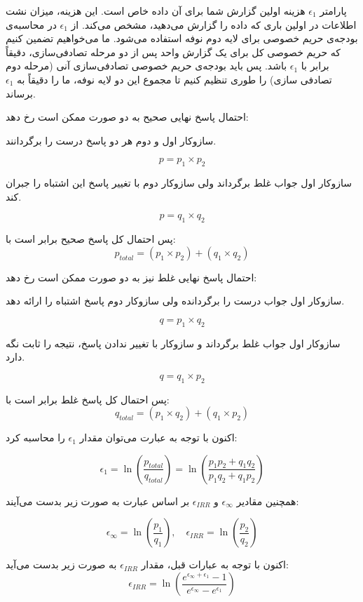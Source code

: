 پارامتر $\epsilon_1$ هزینه اولین گزارش شما برای آن داده خاص است. این هزینه، میزان نشت اطلاعات در اولین باری که داده‌ را گزارش می‌دهید، مشخص می‌کند. از $\epsilon_1$ در محاسبه‌ی بودجه‌ی حریم خصوصی برای لایه دوم نوفه استفاده می‌شود. ما می‌خواهیم تضمین کنیم که حریم خصوصی کل برای یک گزارش واحد پس از دو مرحله تصادفی‌سازی، دقیقاً برابر با $\epsilon_1$ باشد.  پس باید بودجه‌ی حریم خصوصی تصادفی‌سازی آنی (مرحله دوم تصادفی سازی) را طوری تنظیم کنیم تا مجموع این دو لایه نوفه، ما را دقیقاً به $\epsilon_1$ برساند.


احتمال پاسخ نهایی صحیح به دو صورت ممکن است رخ دهد:


 سازوکار اول و دوم هر دو پاسخ درست را برگردانند.

$$p = p_1 \times p_2$$

 سازوکار اول جواب غلط برگرداند ولی سازوکار دوم با تغییر پاسخ این اشتباه را جبران کند.

$$p = q_1 \times q_2$$

پس احتمال کل پاسخ صحیح برابر است با:
$$p_{total} = (p_1 \times p_2) + (q_1 \times q_2)$$

احتمال پاسخ نهایی غلط نیز به دو صورت ممکن است رخ دهد:


 سازوکار اول جواب درست را برگردانده ولی سازوکار دوم پاسخ اشتباه را ارائه دهد.

$$q = p_1 \times q_2$$

 سازوکار اول جواب غلط برگرداند و سازوکار با تغییر ندادن پاسخ، نتیجه را ثابت نگه دارد.

$$q = q_1 \times p_2$$

پس احتمال کل پاسخ غلط برابر است با:
$$q_{total} = (p_1 \times q_2) + (q_1 \times p_2)$$

اکنون با توجه به عبارت  می‌توان مقدار $\epsilon_1$ را محاسبه کرد:

$$\epsilon_1 = \ln \left( \frac{p_{total}}{q_{total}} \right) = \ln \left( \frac{p_1 p_2 + q_1 q_2}{p_1 q_2 + q_1 p_2} \right)$$

همچنین مقادیر $\epsilon_\infty$ و $\epsilon_{IRR}$ بر اساس عبارت  به صورت زیر بدست می‌آیند:

$$\epsilon_\infty = \ln \left( \frac{p_1}{q_1} \right), \quad \epsilon_{IRR} = \ln \left( \frac{p_2}{q_2} \right)$$

اکنون با توجه به عبارات قبل، مقدار $\epsilon_{IRR}$ به صورت زیر بدست می‌آید:
$$\epsilon_{IRR} = \ln \left( \frac{e^{\epsilon_{\infty}+\epsilon_1} - 1}{e^{\epsilon_{\infty}} - e^{\epsilon_1}} \right)$$

